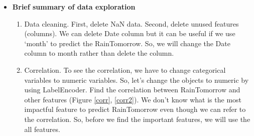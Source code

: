 \documentclass[12pt]{article}
\begin{document}
\begin{itemize}
\item \textbf{Brief summary of data exploration}
    \begin{enumerate}
    \item Data cleaning. First, delete NaN data. Second, delete unused features (columns). We can delete Date column but it can be useful if we use `month' to predict the RainTomorrow. So, we will change the Date column to month rather than delete the column.
    \item Correlation. To see the correlation, we have to change categorical variables to numeric variables. So, let's change the objects to numeric by using LabelEncoder. Find the correlation between RainTomorrow and other features (Figure \ref{corr}, \ref{corr2}). We don't know what is the most impactful feature to predict RainTomorrow even though we can refer to the correlation. So, before we find the important features, we will use the all features.
    
    \begin{figure}[H]
      \centering
      \hfill
    \end{figure}


\end{enumerate}
\end{itemize}
\end{document}
